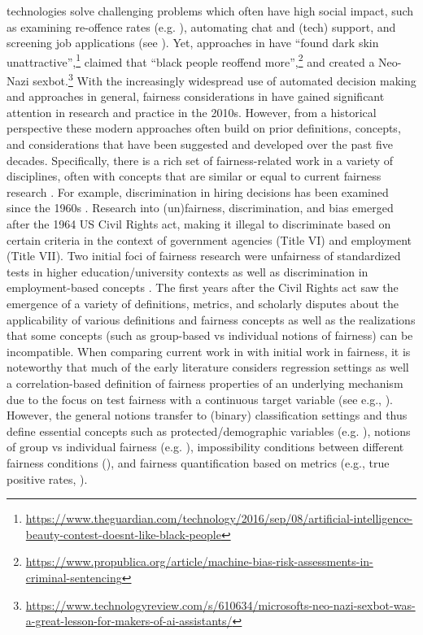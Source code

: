 

\ml technologies solve challenging problems which often have high social impact, such as examining re-offence rates (e.g. ), automating chat and (tech) support, and screening job applications (see ). 
Yet, approaches in \ml have ``found dark skin unattractive'',\footnote{\url{https://www.theguardian.com/technology/2016/sep/08/artificial-intelligence-beauty-contest-doesnt-like-black-people}} claimed that ``black people reoffend more'',\footnote{\url{https://www.propublica.org/article/machine-bias-risk-assessments-in-criminal-sentencing}} and created a Neo-Nazi sexbot.\footnote{\url{https://www.technologyreview.com/s/610634/microsofts-neo-nazi-sexbot-was-a-great-lesson-for-makers-of-ai-assistants/}} With the increasingly widespread use of automated decision making and \ml approaches in general, fairness considerations in \ml have gained significant attention in research and practice in the 2010s. However, from a historical perspective these modern approaches often build on prior definitions, concepts, and considerations that have been suggested and developed over the past five decades. Specifically, there is a rich set of fairness-related work in a variety of disciplines, often with concepts that are similar or equal to current \ml fairness research . For example, discrimination in hiring decisions has been examined since the 1960s . 
Research into (un)fairness, discrimination, and bias emerged after the 1964 US Civil Rights act, making it illegal to discriminate based on certain criteria in the context of government agencies (Title VI) and employment (Title VII). Two initial foci of fairness research were unfairness of standardized tests in higher education/university contexts  as well as discrimination in employment-based concepts . The first years after the Civil Rights act saw the emergence of a variety of definitions, metrics, and scholarly disputes about the applicability of various definitions and fairness concepts as well as the realizations that some concepts (such as group-based vs individual notions of fairness) can be incompatible. 
When comparing current work in \ml with initial work in fairness, it is noteworthy that much of the early literature considers regression settings as well a correlation-based definition of fairness properties of an underlying mechanism due to the focus on test fairness with a continuous target variable (see e.g., ). However, the general notions transfer to (binary) classification settings and thus define essential concepts such as protected/demographic variables (e.g. ), notions of group vs individual fairness (e.g. ), impossibility conditions between different fairness conditions (), and fairness quantification based on metrics (e.g., true positive rates, ).
